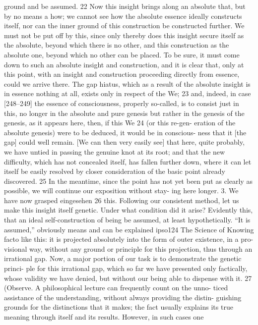 ground and be assumed. 22 Now this insight brings along an absolute that, but
by no means a how; we cannot see how the absolute essence ideally constructs
itself, nor can the inner ground of this construction be constructed further. We
must not be put off by this, since only thereby does this insight secure itself as
the absolute, beyond which there is no other, and this construction as the
absolute one, beyond which no other can be placed. To be sure, it must come
down to such an absolute insight and construction, and it is clear that, only at
this point, with an insight and construction proceeding directly from essence,
could we arrive there. The gap {hiatus}, which as a result of the absolute
insight is in essence nothing at all, exists only in respect of the We; 23 and,
indeed, in case [248–249] the essence of consciousness, properly so-called, is
to consist just in this, no longer in the absolute and pure genesis but rather in
the genesis of the genesis, as it appears here, then, if this We 24 (or this re-gen-
eration of the absolute genesis) were to be deduced, it would be in conscious-
ness that it [the gap] could well remain. [We can then very easily see] that
here, quite probably, we have untied in passing the genuine knot at its root;
and that the new difficulty, which has not concealed itself, has fallen further
down, where it can let itself be easily resolved by closer consideration of the
basic point already discovered. 25 In the meantime, since the point has not yet
been put as clearly as possible, we will continue our exposition without stay-
ing here longer.
3. We have now grasped {eingesehen} 26 this. Following our consistent
method, let us make this insight itself genetic. Under what condition did it
arise? Evidently this, that an ideal self-construction of being be assumed, at
least hypothetically. “It is assumed,” obviously means and can be explained ipso124
The Science of Knowing
facto like this: it is projected absolutely into the form of outer existence, in a pro-
visional way, without any ground or principle for this projection, thus through
an irrational gap.
Now, a major portion of our task is to demonstrate the genetic princi-
ple for this irrational gap, which so far we have presented only factically, whose
validity we have denied, but without our being able to dispense with it. 27
(Observe. A philosophical lecture can frequently count on the unno-
ticed assistance of the understanding, without always providing the distin-
guishing grounds for the distinctions that it makes; the fact usually explains
its true meaning through itself and its results. However, in such cases one
